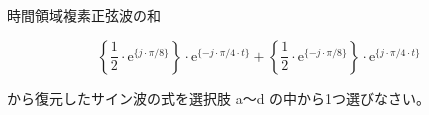 時間領域複素正弦波の和

\[
\left \{ \frac{1}{2} \cdot \textrm{e}^{\{ j \cdot \pi/8 \}} \right \} \cdot \textrm{e}^{\{-j \cdot \pi/4 \cdot t \}} +  
\left \{ \frac{1}{2} \cdot \textrm{e}^{\{-j \cdot \pi/8 \}} \right \} \cdot \textrm{e}^{\{ j \cdot \pi/4 \cdot t \}}
\]

\bigskip
\noindent から復元したサイン波の式を選択肢 a〜d の中から1つ選びなさい。
